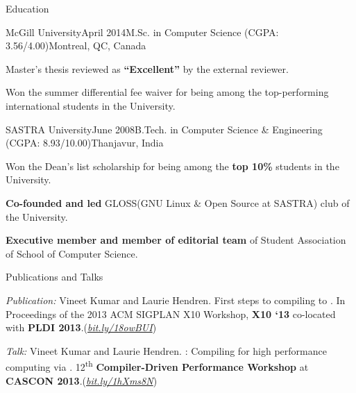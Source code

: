 \documentclass{resume} %
\begin{document}
\begin{rSection}{Education}

\begin{rSubsection}{McGill University}{April 2014}{M.Sc. in
Computer Science (CGPA: 3.56/4.00)}{Montreal, QC, Canada} 
\item Master's thesis reviewed as \textbf{``Excellent''} by the external
reviewer.
\item Won the {summer differential fee waiver} for being among the top-performing
international students in the University.  
\end{rSubsection}

\begin{rSubsection}{SASTRA University}{June 2008}{B.Tech. in Computer Science \&
Engineering (CGPA: 8.93/10.00)}{Thanjavur, India} 
\item Won the {Dean's list scholarship} for being among the \textbf{top
10\%} students in the University. 
\item \textbf{Co-founded and led} GLOSS(GNU Linux \& Open Source at SASTRA) club
of the University.  
\item \textbf{Executive member and member of editorial team} of Student
Association of School of Computer Science. 
\end{rSubsection}

\end{rSection}


\begin{rSection}{Publications and Talks}
\smallskip
\begin{lSubsection}

\item \emph{Publication:} Vineet Kumar and Laurie Hendren. First steps to
compiling \matlab to \xten. In Proceedings of the 2013 ACM SIGPLAN X10 Workshop,
\textbf{X10 `13} co-located with \textbf{PLDI
2013}.(\href{http://www.sable.mcgill.ca/mclab/mix10/paper.pdf}{\em{bit.ly/18owBUI}})

\item \emph{Talk:} Vineet Kumar and Laurie Hendren. \mixten: Compiling \matlab
for high performance computing via \xten. 12\textsuperscript{th}
\textbf{Compiler-Driven Performance Workshop} at \textbf{CASCON
2013}.(\href{http://webdocs.cs.ualberta.ca/~amaral/cascon/CDP13/#VinetKumar}{\em{bit.ly/1hXms8N}}) 

\end{lSubsection}
\end{rSection}
\end{document}
